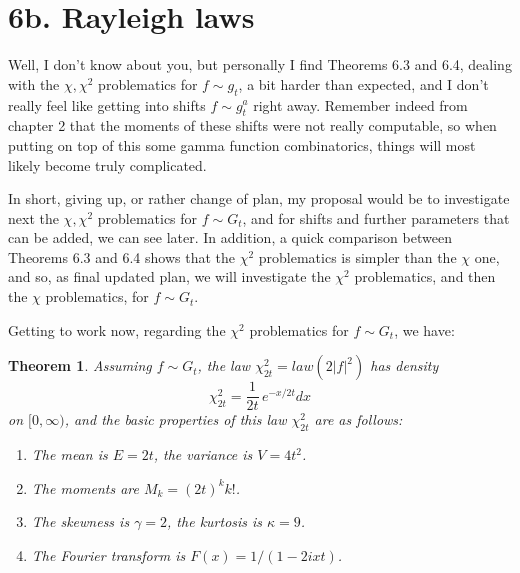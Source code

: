 \documentclass[12pt]{amsbook}
\newtheorem{theorem}{Theorem}[chapter]
\begin{document}
\section*{6b. Rayleigh laws}

Well, I don't know about you, but personally I find Theorems 6.3 and 6.4, dealing with the $\chi,\chi^2$ problematics for $f\sim g_t$, a bit harder than expected, and I don't really feel like getting into shifts $f\sim g_t^a$ right away. Remember indeed from chapter 2 that the moments of these shifts were not really computable, so when putting on top of this some gamma function combinatorics, things will most likely become truly complicated.

\bigskip

In short, giving up, or rather change of plan, my proposal would be to investigate next the $\chi,\chi^2$ problematics for $f\sim G_t$, and for shifts and further parameters that can be added, we can see later. In addition, a quick comparison between Theorems 6.3 and 6.4 shows that the $\chi^2$ problematics is simpler than the $\chi$ one, and so, as final updated plan, we will investigate the $\chi^2$ problematics, and then the $\chi$ problematics, for $f\sim G_t$.

\bigskip

Getting to work now, regarding the $\chi^2$ problematics for $f\sim G_t$, we have:

\begin{theorem}
Assuming $f\sim G_t$, the law $\chi_{2t}^2=law(2|f|^2)$ has density
$$\chi^2_{2t}=\frac{1}{2t}\,e^{-x/2t}dx$$
on $[0,\infty)$, and the basic properties of this law $\chi_{2t}^2$ are as follows:
\begin{enumerate}
\item The mean is $E=2t$, the variance is $V=4t^2$.

\item The moments are $M_k=(2t)^kk!$.

\item The skewness is $\gamma=2$, the kurtosis is $\kappa=9$.

\item The Fourier transform is $F(x)=1/(1-2ixt)$.
\end{enumerate}
\end{theorem}
\end{document}

